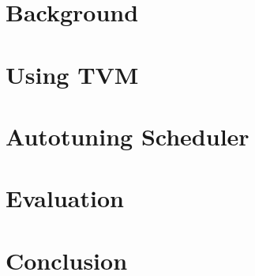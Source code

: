 	\chapter{Background}\label{sec:background}
	
	\chapter{Using TVM}\label{sec:using-tvm}
	
	\chapter{Autotuning Scheduler}\label{sec:autotuning-scheduler}
	
	\chapter{Evaluation}\label{sec:evaluation}
	
	\chapter{Conclusion}
	
	
	\clearpage
	
	
	\cleardoublepage
	\printbibliography

	\printglossary[style=altlist]
	
	\appendix
	
